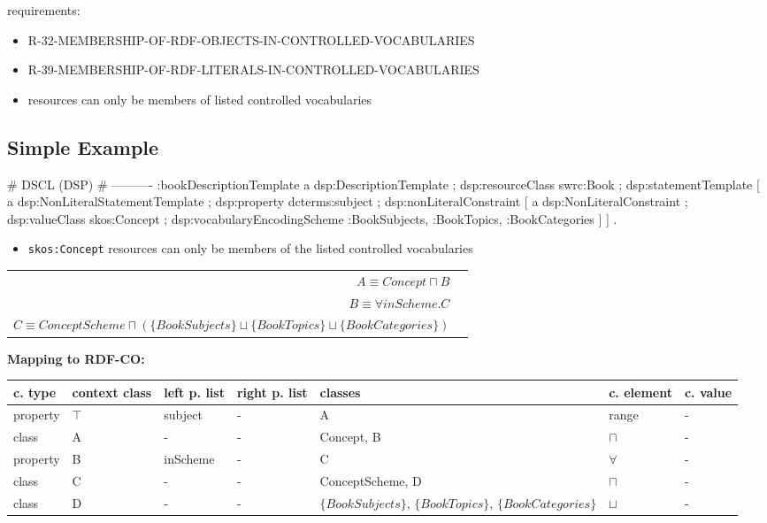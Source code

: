 \documentclass{llncs}
\newcommand{\ms}[1]{\texttt{#1}}
\newenvironment{gcotable}{
  \scriptsize
  \sffamily
  \vspace{0cm}
	\begin{center}
	\textbf{\vspace{0.4cm}Mapping to RDF-CO:} \\
  \begin{tabular}{l|l|l|l|l|l|l}
	\hline
  \textbf{c. type} & \textbf{context class} & \textbf{left p. list} & \textbf{right p. list} & \textbf{classes} & \textbf{c. element} & \textbf{c. value} \\
  \hline

}{
  \hline
  \end{tabular}
	\end{center}
}
\newenvironment{DL}{
  \vspace{0cm}
	\begin{center}
  \begin{tabular}{r l}

}{
  \end{tabular}
	\end{center}
}
\newcommand{\er}[1]{\todo[size=\small, color=red!40]{\textbf{Erman:} #1}}
\begin{document}
requirements:

\begin{itemize}
	\item R-32-MEMBERSHIP-OF-RDF-OBJECTS-IN-CONTROLLED-VOCABULARIES
	\item R-39-MEMBERSHIP-OF-RDF-LITERALS-IN-CONTROLLED-VOCABULARIES
\end{itemize}



\begin{itemize}
	\item resources can only be members of listed controlled vocabularies
\end{itemize}

\subsection{Simple Example}

\begin{ex}
# DSCL (DSP)
# ----------
:bookDescriptionTemplate 
    a dsp:DescriptionTemplate ;
    dsp:resourceClass swrc:Book ; 
    dsp:statementTemplate [
        a dsp:NonLiteralStatementTemplate ;
        dsp:property dcterms:subject ; 
        dsp:nonLiteralConstraint [ 
            a dsp:NonLiteralConstraint ;
            dsp:valueClass skos:Concept ; 
            dsp:vocabularyEncodingScheme :BookSubjects, :BookTopics, :BookCategories ] ] .
\end{ex}

\begin{itemize}
	\item \ms{skos:Concept} resources can only be members of the listed controlled vocabularies
\end{itemize}
\begin{DL}
$A \equiv Concept \sqcap B$ \\
$B \equiv \forall inScheme . C$ \\
$C \equiv ConceptScheme \sqcap ( \{BookSubjects\} \sqcup \{BookTopics\} \sqcup \{BookCategories\} )$
\end{DL}

\begin{gcotable}
property & $\top$ & subject & - & A & range & - \\
class & A & - & - & Concept, B & $\sqcap$ & - \\
property & B & inScheme & - & C & $\forall$ & - \\
class & C & - & - & ConceptScheme, D & $\sqcap$ & - \\
class & D & - & - & $\{BookSubjects\}$, $\{BookTopics\}$, $\{BookCategories\}$ & $\sqcup$ & - \\
\end{gcotable}
\end{document}
